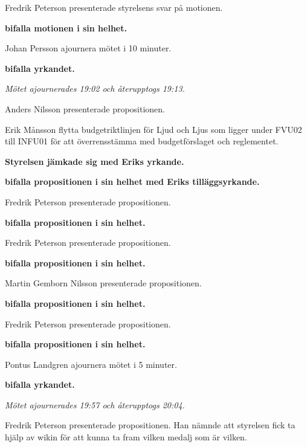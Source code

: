 \documentclass[10pt]{article}
\begin{document}
\begin{paragrafer}
\begin{paragrafer}
        Fredrik Peterson presenterade styrelsens svar på motionen.

        \textbf{\Mba bifalla motionen i sin helhet.}

        Johan Persson \ypa ajournera mötet i 10 minuter.

        \textbf{\Mba bifalla yrkandet.}

        \emph{Mötet ajournerades 19:02 och återupptogs 19:13.}

    \end{paragrafer}
    \begin{paragrafer}
        Anders Nilsson presenterade propositionen.

        Erik Månsson \ypa flytta budgetriktlinjen för Ljud och Ljus som ligger under FVU02 till INFU01 för att överrensstämma med budgetförslaget och reglementet.

        \textbf{Styrelsen jämkade sig med Eriks yrkande.}

        \textbf{\Mba bifalla propositionen i sin helhet med Eriks tilläggsyrkande.}

        Fredrik Peterson presenterade propositionen.

        \textbf{\Mba bifalla propositionen i sin helhet.}

        Fredrik Peterson presenterade propositionen.

        \textbf{\Mba bifalla propositionen i sin helhet.}

        Martin Gemborn Nilsson presenterade propositionen.

        \textbf{\Mba bifalla propositionen i sin helhet.}

        Fredrik Peterson presenterade propositionen.

        \textbf{\Mba bifalla propositionen i sin helhet.}

        Pontus Landgren \ypa ajournera mötet i 5 minuter.

        \textbf{\Mba bifalla yrkandet.}

        \emph{Mötet ajournerades 19:57 och återupptogs 20:04.}

        Fredrik Peterson presenterade propositionen. Han nämnde att styrelsen fick ta hjälp av wikin för att kunna ta fram vilken medalj som är vilken.


\end{paragrafer}
\end{paragrafer}
\end{document}

